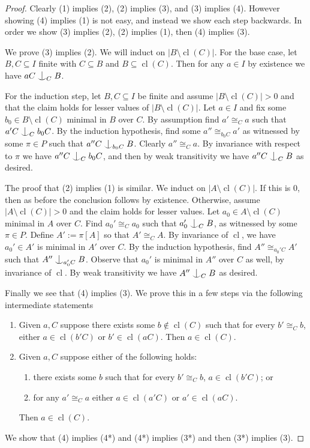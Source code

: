 \documentclass[12pt]{amsart}
\theoremstyle{plain}
\theoremstyle{definition}
\newcommand{\isom}{\cong}
\DeclareMathOperator{\cl}{cl}
\newcommand{\forkindep}[1][]{%
  \mathrel{
    \mathop{
      \vcenter{
        \hbox{\oalign{\noalign{\kern-.3ex}\hfil$\vert$\hfil\cr
              \noalign{\kern-.7ex}
              $\smile$\cr\noalign{\kern-.3ex}}}
      }
    }\displaylimits_{#1}
  }
}
\begin{document}
\begin{proof}
Clearly (1) implies (2), (2) implies (3), and (3) implies (4).
However showing (4) implies (1) is not easy, and instead we show each step backwards. In order we show (3) implies (2), (2) implies (1), then (4) implies (3).

We prove (3) implies (2).
We will induct on $|B \setminus \cl(C)|$.
For the base case, let $B, C \subseteq I$ finite with $C \subseteq B$ and $B \subseteq \cl(C)$.
Then for any $a \in I$ by existence we have $aC \forkindep[C] B$.

For the induction step, let $B, C \subseteq I$ be finite and assume $|B \setminus \cl(C)| > 0$ and that the claim holds for lesser values of $|B \setminus \cl(C)|$.
Let $a \in I$ and fix some $b_0 \in B \setminus \cl(C)$ minimal in $B$ over $C$.
By assumption find $a' \isom_C a$ such that $a'C \forkindep[C] b_0C$. 
By the induction hypothesis, find some $a'' \isom_{b_0C} a'$ as witnessed by some $\pi \in P$ such that $a''C \forkindep[b_0C] B$.
Clearly $a'' \isom_C a$.
By invariance with respect to $\pi$ we have $a''C \forkindep[C] b_0C$, and then by weak transitivity we have $a''C \forkindep[C] B$ as desired.

The proof that (2) implies (1) is similar.
We induct on $|A \setminus \cl(C)|$. 
If this is 0, then as before the conclusion follows by existence.
Otherwise, assume $|A \setminus \cl(C)| > 0$ and the claim holds for lesser values.
Let $a_0 \in A \setminus \cl(C)$ minimal in $A$ over $C$.
Find $a_0' \isom_C a_0$ such that $a_0' \forkindep[C] B$, as witnessed by some $\pi \in P$.
Define $A' := \pi[A]$ so that $A' \isom_C A$.
By invariance of $\cl$, we have $a_0' \in A'$ is minimal in $A'$ over $C$.
By the induction hypothesis, find $A'' \isom_{a_0'C} A'$ such that $A'' \forkindep[a_0'C] B$.
Observe that $a_0'$ is minimal in $A''$ over $C$ as well, by invariance of $\cl$.
By weak transitivity we have $A'' \forkindep[C] B$ as desired.

Finally we see that (4) implies (3). 
We prove this in a few steps via the following intermediate statements
\begin{enumerate}
    \item[(3*)] Given $a, C$ suppose there exists some $b \not\in \cl(C)$ such that for every $b' \isom_C b$, either $a \in \cl(b'C)$ or $b' \in \cl(aC)$. Then $a \in \cl(C)$.
    \item[(4*)] Given $a, C$ suppose either of the following holds:
    \begin{enumerate}
        \item[(a)] there exists some $b$ such that for every $b' \isom_C b$, $a \in \cl(b'C)$; or
        \item[(b)] for any $a' \isom_C a$ either $a \in \cl(a'C)$ or $a' \in \cl(aC)$.
    \end{enumerate}
    Then $a \in \cl(C)$.
\end{enumerate}
We show that (4) implies (4*) and (4*) implies (3*) and then (3*) implies (3).


\end{proof}
\end{document}
